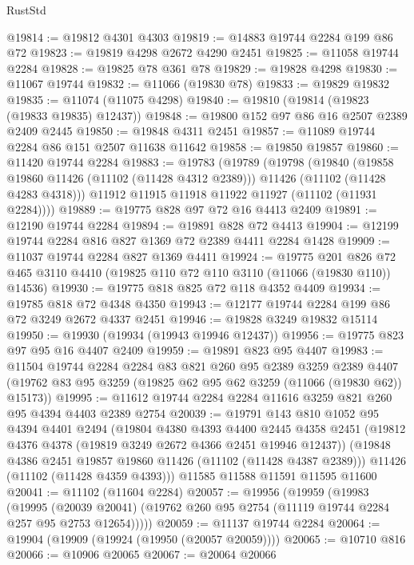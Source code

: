 \begin{lexlean}{RustStd}
\begin{coremodule}
@19814 := @19812 @4301 @4303
@19819 := @14883 @19744 @2284 @199 @86 @72
@19823 := @19819 @4298 @2672 @4290 @2451
@19825 := @11058 @19744 @2284
@19828 := @19825 @78 @361 @78
@19829 := @19828 @4298
@19830 := @11067 @19744
@19832 := @11066 (@19830 @78)
@19833 := @19829 @19832
@19835 := @11074 (@11075 @4298)
@19840 := @19810 (@19814 (@19823 (@19833 @19835) @12437))
@19848 := @19800 @152 @97 @86 @16 @2507 @2389 @2409 @2445
@19850 := @19848 @4311 @2451
@19857 := @11089 @19744 @2284 @86 @151 @2507 @11638 @11642
@19858 := @19850 @19857
@19860 := @11420 @19744 @2284
@19883 := @19783
    (@19789
      (@19798
        (@19840
          (@19858 @19860 @11426 (@11102 (@11428 @4312 @2389)))
          @11426
          (@11102 (@11428 @4283 @4318)))
        @11912
        @11915
        @11918
        @11922
        @11927
        (@11102 (@11931 @2284))))
@19889 := @19775 @828 @97 @72 @16 @4413 @2409
@19891 := @12190 @19744 @2284
@19894 := @19891 @828 @72 @4413
@19904 := @12199 @19744 @2284 @816 @827 @1369 @72 @2389 @4411 @2284 @1428
@19909 := @11037 @19744 @2284 @827 @1369 @4411
@19924 := @19775
    @201
    @826
    @72
    @465
    @3110
    @4410
    (@19825 @110 @72 @110 @3110 (@11066 (@19830 @110)) @14536)
@19930 := @19775 @818 @825 @72 @118 @4352 @4409
@19934 := @19785 @818 @72 @4348 @4350
@19943 := @12177 @19744 @2284 @199 @86 @72 @3249 @2672 @4337 @2451
@19946 := @19828 @3249 @19832 @15114
@19950 := @19930 (@19934 (@19943 @19946 @12437))
@19956 := @19775 @823 @97 @95 @16 @4407 @2409
@19959 := @19891 @823 @95 @4407
@19983 := @11504
    @19744
    @2284
    @2284
    @83
    @821
    @260
    @95
    @2389
    @3259
    @2389
    @4407
    (@19762 @83 @95 @3259 (@19825 @62 @95 @62 @3259 (@11066 (@19830 @62)) @15173))
@19995 := @11612 @19744 @2284 @2284 @11616 @3259 @821 @260 @95 @4394 @4403 @2389 @2754
@20039 := @19791
    @143
    @810
    @1052
    @95
    @4394
    @4401
    @2494
    (@19804
      @4380
      @4393
      @4400
      @2445
      @4358
      @2451
      (@19812 @4376 @4378 (@19819 @3249 @2672 @4366 @2451 @19946 @12437))
      (@19848 @4386 @2451 @19857 @19860 @11426 (@11102 (@11428 @4387 @2389)))
      @11426
      (@11102 (@11428 @4359 @4393)))
    @11585
    @11588
    @11591
    @11595
    @11600
@20041 := @11102 (@11604 @2284)
@20057 := @19956
    (@19959
      (@19983
        (@19995
          (@20039 @20041)
          (@19762 @260 @95 @2754 (@11119 @19744 @2284 @257 @95 @2753 @12654)))))
@20059 := @11137 @19744 @2284
@20064 := @19904 (@19909 (@19924 (@19950 (@20057 @20059))))
@20065 := @10710 @816
@20066 := @10906 @20065
@20067 := @20064 @20066

\end{coremodule}
\end{lexlean}
